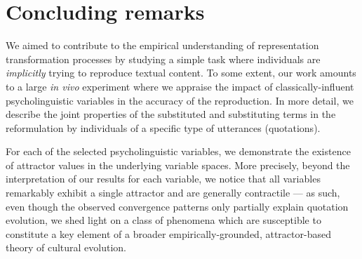 \section{Concluding remarks}\label{sec:conclusion}



We aimed to contribute to the empirical understanding of representation transformation processes %
 by studying a simple task where individuals are \emph{implicitly} trying to reproduce textual content. To some extent, our work amounts to a large \emph{in vivo} experiment where we appraise the impact of classically-influent psycholinguistic variables in the accuracy of the reproduction.
In more detail, we describe the joint properties of the substituted and substituting terms in the reformulation by individuals of a specific type of utterances (quotations). %


For each of the selected psycholinguistic variables, we demonstrate the existence of attractor values in the underlying variable spaces. More precisely, beyond the interpretation of our results for each variable, we notice that all variables remarkably exhibit a single attractor and are generally contractile --- as such, even though the observed convergence patterns only partially explain quotation evolution, we shed light on a class of phenomena which are susceptible to constitute a key element of a broader empirically-grounded, attractor-based theory of cultural evolution.


